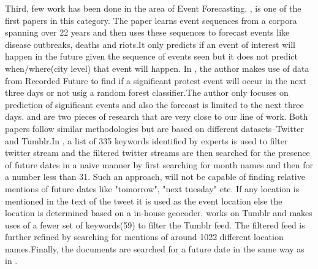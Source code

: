 Third, few work has been done in the area of Event Forecasting. \cite{Radinsky:2013:MWP}, is one of the first papers in this category. The paper learns event sequences from a corpora spanning over 22 years and then uses these sequences to forecast events like disease outbreaks, deaths and riots.It only predicts if an event of interest will happen in the future given the sequence of events seen but it does not predict when/where(city level) that event will happen. In \cite{DBLP:journals/corr/Kallus14}, the author makes use of data from Recorded Future to find if a  significant protest event will occur in the next three days or not usig a random forest classifier.The author only focuses on prediction of significant events and also the forecast is limited to the next three days.\cite{compton2013detecting} and \cite{xu2014civil} are two pieces of research  that are very close to our line of work. Both papers follow similar methodologies but are based on different datasets--Twitter and Tumblr.In \cite{compton2013detecting}, a list of 335 keywords identified by experts is used to filter twitter stream and the filtered twitter streams are then searched for the presence of future dates in a naive manner by first searching for month names and then for a number less than 31. Such an approach, will not be capable of finding relative mentions of future dates like "tomorrow", "next tuesday" etc. If any location is mentioned in the text of the tweet it is used as the event location else the location is determined based on a in-house geocoder\cite{hrlgeocoder}.\cite{xu2014civil} works on Tumblr and makes uses of a fewer set of keywords(59) to filter the Tumblr feed. The filtered feed is further refined by searching for mentions of around 1022 different location names.Finally, the documents are searched for a future date in the same way as in \cite{compton2013detecting}.
